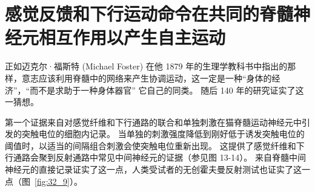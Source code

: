 \section{感觉反馈和下行运动命令在共同的脊髓神经元相互作用以产生自主运动}

正如迈克尔·福斯特 (Michael Foster) 在他 1879 年的生理学教科书中指出的那样，意志应该利用脊髓中的网络来产生协调运动，这一定是一种“身体的经济”，“而不是求助于一种身体器官” 它自己的同类。
随后 140 年的研究证实了这一猜想。


第一个证据来自对感觉纤维和下行通路的联合和单独刺激在猫脊髓运动神经元中引发的突触电位的细胞内记录。
当单独的刺激强度降低到刚好低于诱发突触电位的阈值时，以适当的间隔组合刺激会使突触电位重新出现。
这提供了感觉纤维和下行通路会聚到反射通路中常见中间神经元的证据（参见图 13-14）。
来自脊髓中间神经元的直接记录证实了这一点，人类受试者的无创霍夫曼反射测试也证实了这一点（图~\ref{fig:32_9}）。


